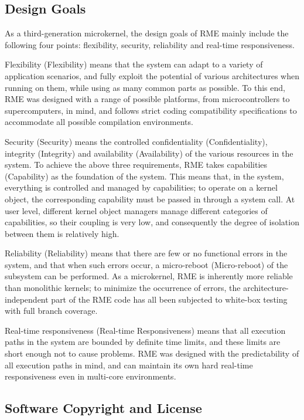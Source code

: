 \subsection{Design Goals}\label{subsec:1-design-goals}

As a third-generation microkernel, the design goals of RME mainly include the following four points: flexibility, security, reliability and real-time responsiveness.

Flexibility (Flexibility) means that the system can adapt to a variety of application scenarios, and fully exploit the potential of various architectures when running on them, while using as many common parts as possible. To this end, RME was designed with a range of possible platforms, from microcontrollers to supercomputers, in mind, and follows strict coding compatibility specifications to accommodate all possible compilation environments.

Security (Security) means the controlled confidentiality (Confidentiality), integrity (Integrity) and availability (Availability) of the various resources in the system. To achieve the above three requirements, RME takes capabilities (Capability) as the foundation of the system. This means that, in the system, everything is controlled and managed by capabilities; to operate on a kernel object, the corresponding capability must be passed in through a system call. At user level, different kernel object managers manage different categories of capabilities, so their coupling is very low, and consequently the degree of isolation between them is relatively high.

Reliability (Reliability) means that there are few or no functional errors in the system, and that when such errors occur, a micro-reboot (Micro-reboot) of the subsystem can be performed. As a microkernel, RME is inherently more reliable than monolithic kernels; to minimize the occurrence of errors, the architecture-independent part of the RME code has all been subjected to white-box testing with full branch coverage.

Real-time responsiveness (Real-time Responsiveness) means that all execution paths in the system are bounded by definite time limits, and these limits are short enough not to cause problems. RME was designed with the predictability of all execution paths in mind, and can maintain its own hard real-time responsiveness even in multi-core environments.

\subsection{Software Copyright and License}\label{subsec:1-copyright-and-license}

